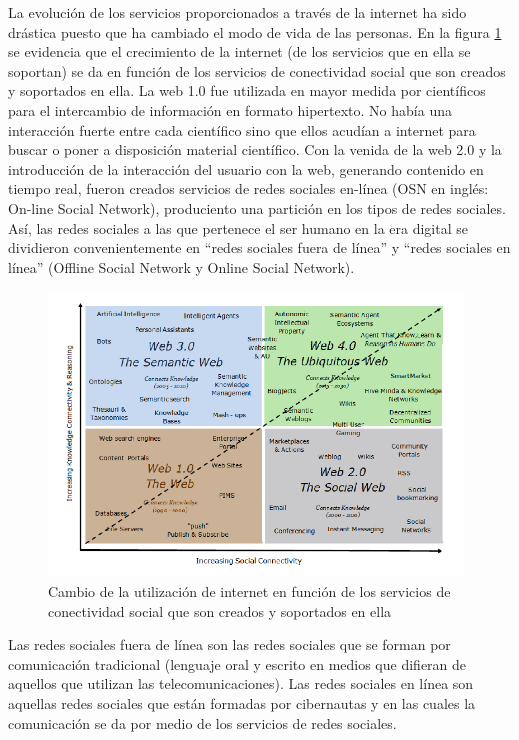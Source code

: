 La evolución de los servicios proporcionados a través de la internet ha sido drástica puesto que ha cambiado el modo de vida de las personas. En la figura \ref{fig:utilizacion_internet} se evidencia que el crecimiento de la internet (de los servicios que en ella se soportan) se da en función de los servicios de conectividad social que son creados y soportados en ella. La web 1.0 fue utilizada en mayor medida por científicos para el intercambio de información en formato hipertexto. No había una interacción fuerte entre cada científico sino que ellos acudían a internet para buscar o poner a disposición material científico. Con la venida de la web 2.0 y la introducción de la interacción del usuario con la web, generando contenido en tiempo real, fueron creados servicios de redes sociales en-línea (OSN en inglés: On-line Social Network), produciento una partición en los tipos de redes sociales. Así, las redes sociales a las que pertenece el ser humano en la era digital se dividieron convenientemente en “redes sociales fuera de línea” y “redes sociales en línea” (Offline Social Network y Online Social Network)\cite[pag.3]{dynamics}.

\begin{figure}[!htb]
  \begin{center}
    \includegraphics[width=11cm]{./imagenes/utilizacion_internet.png}
    \caption{Cambio de la utilización de internet en función de los servicios de conectividad social que son creados y soportados en ella}
    \label{fig:utilizacion_internet}
  \end{center}
\end{figure}

Las redes sociales fuera de línea son las redes sociales que se forman por comunicación tradicional (lenguaje oral y escrito en medios que difieran de aquellos que utilizan las telecomunicaciones). Las redes sociales en línea son aquellas redes sociales que están formadas por cibernautas y en las cuales la comunicación se da por medio de los servicios de redes sociales.\cite[pag.1]{analysis}

